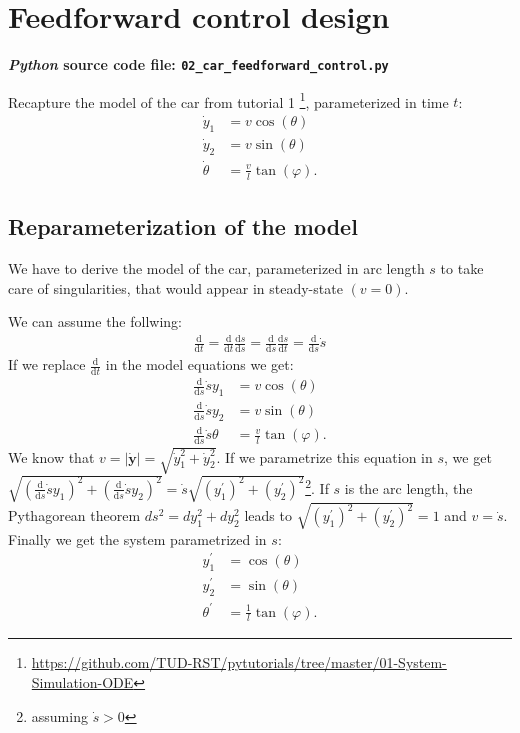 \documentclass[a4paper,11pt,headings=standardclasses,parskip=half]{scrartcl}
\renewcommand{\d}{\mathrm{d}} %
\newcommand{\py}{\emph{Python}\xspace}
\begin{document}
\section{Feedforward control design}
\label{sec:ffcontrol}
\textbf{\py source code file: \texttt{02\_car\_feedforward\_control.py}}

Recapture the model of the car from tutorial 1 \footnote{\url{https://github.com/TUD-RST/pytutorials/tree/master/01-System-Simulation-ODE}}, parameterized in time $t$:
\begin{subequations}
\begin{align}
\dot y_1 &= v \cos(\theta)\\
\dot y_2 &= v \sin(\theta)\\
\dot \theta &= \frac{v}{l}\tan(\varphi).
\end{align}
\end{subequations}
\subsection{Reparameterization of the model}
We have to derive the model of the car, parameterized in arc length $s$ to take care of singularities, that would appear in steady-state $(v=0)$.

We can assume the follwing:
\begin{align*}
\frac{\d}{\d t} = \frac{\d}{\d t}\frac{\d s}{\d s} = \frac{\d}{\d s}\frac{\d s}{\d t} = \frac{\d}{\d s}\dot s
\end{align*}
If we replace $\frac{\d}{\d t}$ in the model equations we get:
\begin{subequations}
\begin{align}
\frac{\d}{\d s}\dot s y_1 &= v \cos(\theta)\\
\frac{\d}{\d s}\dot s y_2 &= v \sin(\theta)\\
\frac{\d}{\d s}\dot s \theta &= \frac{v}{l}\tan(\varphi).
\end{align}
\end{subequations}
We know that $v = |\dot{\bm{y}}| = \sqrt{\dot y_1^2+\dot y_2^2}$. If we parametrize this equation in $s$, we get   $\sqrt{(\frac{\d}{\d s}\dot sy_1)^2+(\frac{\d}{\d s}\dot s y_2)^2}=\dot s \sqrt{(y_1^\prime)^2+(y_2^\prime)^2}$\footnote{assuming $\dot s > 0$}. If $s$ is the arc length, the Pythagorean theorem $ds^2 = dy_1^2 + dy_2^2$ leads to $\sqrt{(y_1^\prime)^2+(y_2^\prime)^2}=1$ and $v=\dot s$. 
Finally we get the system parametrized in $s$:
\begin{subequations}
\begin{align}
y_1^\prime &= \cos(\theta)\\
y_2^\prime &= \sin(\theta)\\
\theta^\prime &= \frac{1}{l}\tan(\varphi).
\end{align}
\end{subequations}
\end{document}
